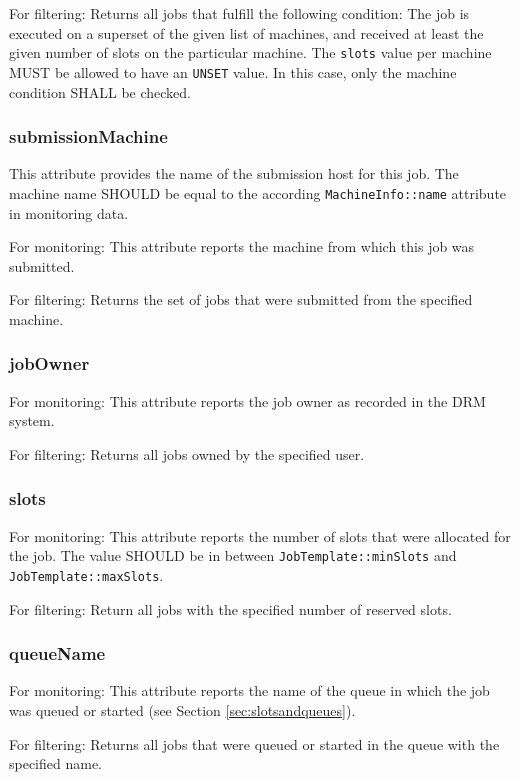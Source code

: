 \documentclass{article}
\newcommand{\h}[1]{\lstinline|#1|}
\begin{document}
For filtering: Returns all jobs that fulfill the following condition: The job is executed on a superset of the given list of machines, and received at least the given number of slots on the particular machine. The \h{slots} value per machine MUST be allowed to have an \h{UNSET} value. In this case, only the machine condition SHALL be checked.

\subsubsection{submissionMachine}

This attribute provides the name of the submission host for this job. The machine name SHOULD be equal to the according \h{MachineInfo::name} attribute in monitoring data.

For monitoring: This attribute reports the machine from which this job was submitted.

For filtering: Returns the set of jobs that were submitted from the specified machine.

\subsubsection{jobOwner}

For monitoring: This attribute reports the job owner as recorded in the DRM system.

For filtering: Returns all jobs owned by the specified user.

\subsubsection{slots}

For monitoring: This attribute reports the number of slots that were allocated for the job. The value SHOULD be in between \h{JobTemplate::minSlots} and \h{JobTemplate::maxSlots}.

For filtering: Return all jobs with the specified number of reserved slots.

\subsubsection{queueName}

For monitoring: This attribute reports the name of the queue in which the job was queued or started (see Section \ref{sec:slotsandqueues}). 

For filtering: Returns all jobs that were queued or started in the queue with the specified name.
\end{document}
